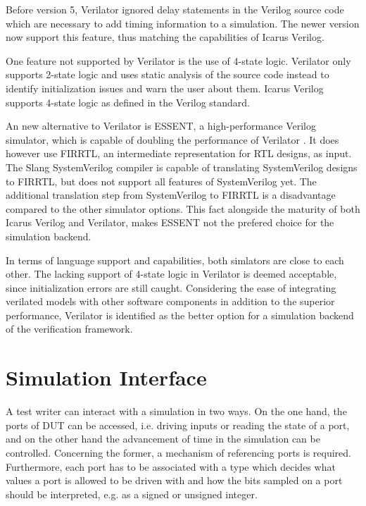 Before version 5, Verilator ignored delay statements in the Verilog source code which are necessary to add timing
information to a simulation. The newer version now support this feature, thus matching the capabilities of Icarus Verilog.

One feature not supported by Verilator is the use of 4-state logic. Verilator only supports 2-state logic and uses
static analysis of the source code instead to identify initialization issues and warn the user about them. Icarus
Verilog supports 4-state logic as defined in the Verilog standard.

An new alternative to Verilator is ESSENT, a high-performance Verilog simulator, which is capable of doubling the performance of Verilator \cite{beamer2021essent}. It does however use FIRRTL, an intermediate representation for RTL designs, as input. The Slang SystemVerilog compiler \cite{slang} is capable of translating SystemVerilog designs to FIRRTL, but does not support all features of SystemVerilog yet. The additional translation step from SystemVerilog to FIRRTL is a disadvantage compared to the other simulator options. This fact alongside the maturity of both Icarus Verilog and Verilator, makes ESSENT not the prefered choice for the simulation backend.

In terms of language support and capabilities, both simlators are close to each other. The lacking support of 4-state
logic in Verilator is deemed acceptable, since initialization errors are still caught. Considering the ease of
integrating verilated models with other software components in addition to the
superior performance, Verilator is identified as the better option for a simulation backend of the verification framework.



\section{Simulation Interface} %

A test writer can interact with a simulation in two ways. On the one hand, the ports of DUT can be accessed, i.e.
driving inputs or reading the state of a port, and on the other hand the advancement of time in the simulation can be
controlled. Concerning the former, a mechanism of referencing ports is required. Furthermore, each port has to be
associated with a type which decides what values a port is allowed to be driven with and how the bits sampled on a
port should be interpreted, e.g. as a signed or unsigned integer.


